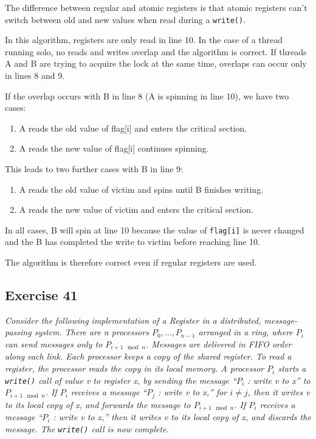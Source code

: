 \documentclass[a4paper,10pt]{article}
\begin{document}
The difference between regular and atomic registers is that atomic registers can't
switch between old and new values when read during a \lstinline|write()|.

In this algorithm, registers are only read in line 10. In the case of a thread running
solo, no reads and writes overlap and the algorithm is correct. If threads A and B
are trying to acquire the lock at the same time, overlaps can occur only in lines
8 and 9. 

If the overlap occurs with B in line 8 (A is spinning in line 10), we have two cases:

\begin{enumerate}
\item A reads the old value of flag[i] and enters the critical section.
\item A reads the new value of flag[i] continues spinning.
\end{enumerate}

This leads to two further cases with B in line 9:

\begin{enumerate}
\item A reads the old value of victim and spins until B finishes writing.
\item A reads the new value of victim and enters the critical section.
\end{enumerate}

In all cases, B will spin at line 10 because the value of \lstinline|flag[i]| is never
changed and the B has completed the write to victim before reaching line 10.

The algorithm is therefore correct even if regular registers are used.

\subsection{Exercise 41}

\emph{Consider the following implementation of a Register in a distributed, 
message-passing system. There are n processors $P_0, ..., P_{n-1}$ arranged in
a ring, where $P_i$ can send messages only to $P_{i+1 \mod n}$. Messages are delivered
in FIFO order along each link.
Each processor keeps a copy of the shared register.
To read a register, the processor reads the copy in its local memory.
A processor $P_i$ starts a \lstinline|write()| call of value v to register x, by sending the
message ``$P_i$ : write v to x'' to $P_{i+1 \mod n}$.
If $P_i$ receives a message ``$P_j$ : write v to x,'' for $i \neq j$, then it writes v to its local
copy of x, and forwards the message to $P_{i+1 \mod n}$.
If $P_i$ receives a message ``$P_i$ : write v to x,'' then it writes v to its local copy of x,
and discards the message. The \lstinline|write()| call is now complete.}
\end{document}
